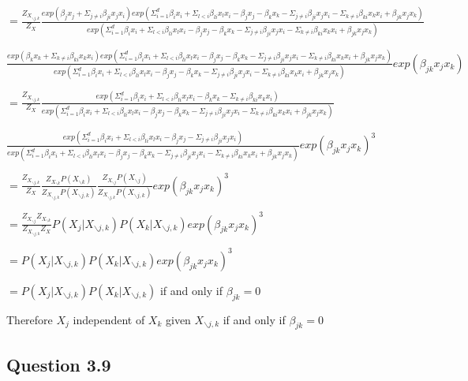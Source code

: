 \documentclass[
]{article}
\begin{document}
\(= \frac{Z_{X_{\backslash j,k}}}{Z_X}\frac{exp(\beta_jx_j+\Sigma_{j\neq i}\beta_{ji}x_jx_i)exp(\Sigma^d_{i=1}\beta_ix_i+\Sigma_{l<i}\beta_{li}x_lx_i-\beta_jx_j-\beta_kx_k-\Sigma_{j\neq i}\beta_{ji}x_jx_i-\Sigma_{k\neq i}\beta_{ki}x_kx_i+\beta_{jk}x_jx_k)}{exp(\Sigma^d_{i=1}\beta_ix_i+\Sigma_{l<i}\beta_{li}x_lx_i-\beta_jx_j-\beta_kx_k-\Sigma_{j\neq i}\beta_{ji}x_jx_i-\Sigma_{k\neq i}\beta_{ki}x_kx_i+\beta_{jk}x_jx_k)}\)

\(\frac{exp(\beta_kx_k+\Sigma_{k\neq i}\beta_{ki}x_kx_i)exp(\Sigma^d_{i=1}\beta_ix_i+\Sigma_{l<i}\beta_{li}x_lx_i-\beta_jx_j-\beta_kx_k-\Sigma_{j\neq i}\beta_{ji}x_jx_i-\Sigma_{k\neq i}\beta_{ki}x_kx_i+\beta_{jk}x_jx_k)}{exp(\Sigma^d_{i=1}\beta_ix_i+\Sigma_{l<i}\beta_{li}x_lx_i-\beta_jx_j-\beta_kx_k-\Sigma_{j\neq i}\beta_{ji}x_jx_i-\Sigma_{k\neq i}\beta_{ki}x_kx_i+\beta_{jk}x_jx_k)}exp(\beta_{jk}x_jx_k)\)

\(= \frac{Z_{X_{\backslash j,k}}}{Z_X}\frac{exp(\Sigma^d_{i=1}\beta_ix_i+\Sigma_{l<i}\beta_{li}x_lx_i-\beta_kx_k-\Sigma_{k\neq i}\beta_{ki}x_kx_i)}{exp(\Sigma^d_{i=1}\beta_ix_i+\Sigma_{l<i}\beta_{li}x_lx_i-\beta_jx_j-\beta_kx_k-\Sigma_{j\neq i}\beta_{ji}x_jx_i-\Sigma_{k\neq i}\beta_{ki}x_kx_i+\beta_{jk}x_jx_k)}\)

\(\frac{exp(\Sigma^d_{i=1}\beta_ix_i+\Sigma_{l<i}\beta_{li}x_lx_i-\beta_jx_j-\Sigma_{j\neq i}\beta_{ji}x_jx_i)}{exp(\Sigma^d_{i=1}\beta_ix_i+\Sigma_{l<i}\beta_{li}x_lx_i-\beta_jx_j-\beta_kx_k-\Sigma_{j\neq i}\beta_{ji}x_jx_i-\Sigma_{k\neq i}\beta_{ki}x_kx_i+\beta_{jk}x_jx_k)}exp(\beta_{jk}x_jx_k)^3\)

\(= \frac{Z_{X_{\backslash j,k}}}{Z_X}\frac{Z_{X_{\backslash k}}P(X_{\backslash k})}{Z_{X_{\backslash j,k}}P(X_{\backslash j,k})}\frac{Z_{X_{\backslash j}}P(X_{\backslash j})}{Z_{X_{\backslash j,k}}P(X_{\backslash j,k})}exp(\beta_{jk}x_jx_k)^3\)

\(= \frac{Z_{X_{\backslash j}}Z_{X_{\backslash k}}}{Z_{X_{\backslash j,k}}Z_X}P(X_j|X_{\backslash j,k})P(X_k|X_{\backslash j,k})exp(\beta_{jk}x_jx_k)^3\)

\(= P(X_j|X_{\backslash j,k})P(X_k|X_{\backslash j,k})exp(\beta_{jk}x_jx_k)^3\)

\(= P(X_j|X_{\backslash j,k})P(X_k|X_{\backslash j,k})\) if and only if
\(\beta_{jk}=0\)

Therefore \(X_j\) independent of \(X_k\) given \(X_{\backslash j,k}\) if
and only if \(\beta_{jk}=0\)

\hypertarget{question-3.9}{%
\subsection{Question 3.9}\label{question-3.9}}
\end{document}
